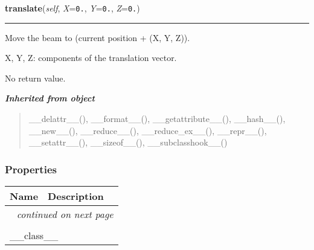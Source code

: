 \hspace{.8\funcindent}\begin{boxedminipage}{\funcwidth}

    \raggedright \textbf{translate}(\textit{self}, \textit{X}={\tt 0.}, \textit{Y}={\tt 0.}, \textit{Z}={\tt 0.})

    \vspace{-1.5ex}

    \rule{\textwidth}{0.5\fboxrule}
\setlength{\parskip}{2ex}
    Move the beam to (current position + (X, Y, Z)).

    X, Y, Z: components of the translation vector.

    No return value.

\setlength{\parskip}{1ex}
    \end{boxedminipage}


\large{\textbf{\textit{Inherited from object}}}

\begin{quote}
\_\_delattr\_\_(), \_\_format\_\_(), \_\_getattribute\_\_(), \_\_hash\_\_(), \_\_new\_\_(), \_\_reduce\_\_(), \_\_reduce\_ex\_\_(), \_\_repr\_\_(), \_\_setattr\_\_(), \_\_sizeof\_\_(), \_\_subclasshook\_\_()
\end{quote}


  \subsubsection{Properties}

    \vspace{-1cm}
\hspace{\varindent}\begin{longtable}{|p{\varnamewidth}|p{\vardescrwidth}|l}
\cline{1-2}
\cline{1-2} \centering \textbf{Name} & \centering \textbf{Description}& \\
\cline{1-2}
\endhead\cline{1-2}\multicolumn{3}{r}{\small\textit{continued on next page}}\\\endfoot\cline{1-2}
\endlastfoot\multicolumn{2}{|l|}{\textit{Inherited from object}}\\
\multicolumn{2}{|p{\varwidth}|}{\raggedright \_\_class\_\_}\\
\cline{1-2}
\end{longtable}


